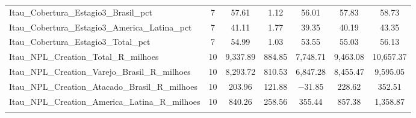 \begin{table}[!htbp]
\begin{tabular}{@{\extracolsep{5pt}}lcccccc}
Itau\_Cobertura\_Estagio3\_Brasil\_pct & 7 & 57.61 & 1.12 & 56.01 & 57.83 & 58.73 \\ 
Itau\_Cobertura\_Estagio3\_America\_Latina\_pct & 7 & 41.11 & 1.77 & 39.35 & 40.19 & 43.35 \\ 
Itau\_Cobertura\_Estagio3\_Total\_pct & 7 & 54.99 & 1.03 & 53.55 & 55.03 & 56.13 \\ 
Itau\_NPL\_Creation\_Total\_R\_milhoes & 10 & 9,337.89 & 884.85 & 7,748.71 & 9,463.08 & 10,657.37 \\ 
Itau\_NPL\_Creation\_Varejo\_Brasil\_R\_milhoes & 10 & 8,293.72 & 810.53 & 6,847.28 & 8,455.47 & 9,595.05 \\ 
Itau\_NPL\_Creation\_Atacado\_Brasil\_R\_milhoes & 10 & 203.96 & 121.88 & $-$31.85 & 228.62 & 352.51 \\ 
Itau\_NPL\_Creation\_America\_Latina\_R\_milhoes & 10 & 840.26 & 258.56 & 355.44 & 857.38 & 1,358.87 \\ 
\hline \\[-1.8ex] 
\end{tabular} 
\end{table} 
